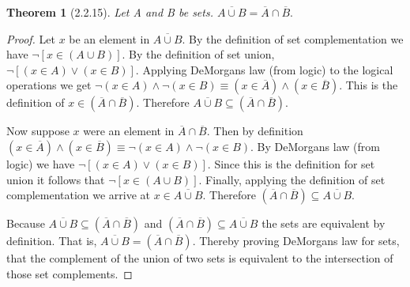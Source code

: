 \documentclass[a4paper, 12pt]{article}
\theoremstyle{plain}
\newtheorem*{theorem*}{Theorem}
\begin{document}
	
	\begin{theorem*}[2.2.15]
		Let A and B be sets. $\overline{A \cup B} = \overline{A} \cap \overline{B}.$
	\end{theorem*}
	
	\begin{proof}
		Let $x$ be an element in $\overline{A \cup B}$. By the definition of set \newline complementation we have $\lnot [x \in (A \cup B)]$. By the definition of set union, \newline $\lnot [(x \in A) \lor (x \in B)]$. Applying DeMorgans law (from logic) to the logical operations we get $\lnot(x \in A) \land \lnot(x \in B) \equiv (x \in \overline{A}) \land (x \in \overline{B})$. This is the definition of $x \in (\overline{A} \cap \overline{B})$. Therefore $\overline{A \cup B} \subseteq (\overline{A} \cap \overline{B})$. 
		
		Now suppose $x$ were an element in $\overline{A} \cap \overline{B}$. Then by definition \newline $(x \in \overline{A}) \land (x \in \overline{B}) \equiv \lnot (x \in A) \land \lnot (x \in B)$. By DeMorgans law (from logic) we have $\lnot [(x \in A) \lor (x \in B)]$. Since this is the definition for set union it follows that $\lnot [x \in (A \cup B)]$. Finally, applying the definition of set complementation we arrive at $x \in \overline{A \cup B}$. Therefore $(\overline{A} \cap \overline{B}) \subseteq \overline{A \cup B}$.
		
		Because $\overline{A \cup B} \subseteq (\overline{A} \cap \overline{B})$ and $(\overline{A} \cap \overline{B}) \subseteq \overline{A \cup B}$ the sets are equivalent by definition. That is,  $\overline{A \cup B} = (\overline{A} \cap \overline{B})$. Thereby proving DeMorgans law for sets, that the complement of the union of two sets is equivalent to the intersection of those set complements.
		
	\end{proof}
\end{document}
